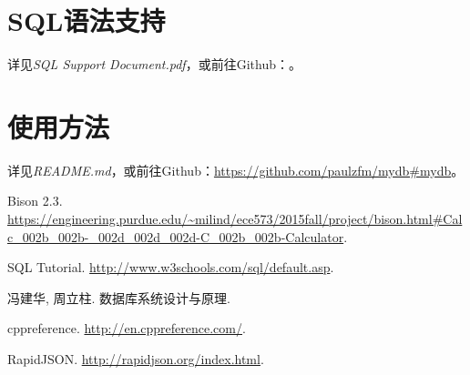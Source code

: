 \documentclass[11pt, a4paper]{article}
\begin{document}
\section{SQL语法支持}

详见\textit{SQL Support Document.pdf}，或前往Github：\url{}。

\section{使用方法}

详见\textit{README.md}，或前往Github：\url{https://github.com/paulzfm/mydb#mydb}。

\begin{thebibliography}{9}

 Bison 2.3. \url{https://engineering.purdue.edu/~milind/ece573/2015fall/project/bison.html#Calc_002b_002b-_002d_002d_002d-C_002b_002b-Calculator}.

 SQL Tutorial. \url{http://www.w3schools.com/sql/default.asp}.

 冯建华, 周立柱. 数据库系统设计与原理. 

 cppreference. \url{http://en.cppreference.com/}.

 RapidJSON. \url{http://rapidjson.org/index.html}.

\end{thebibliography}
\end{document}
